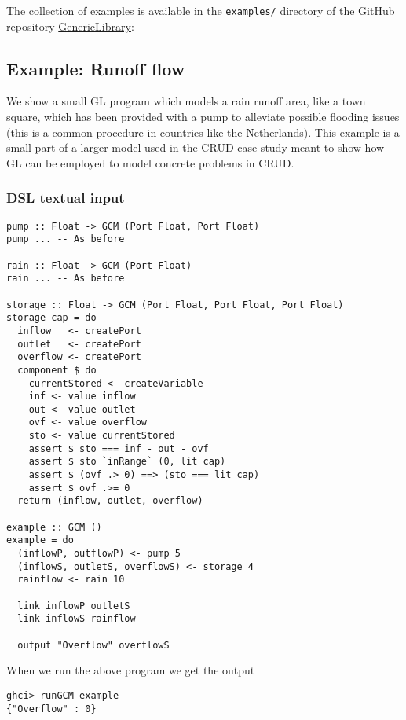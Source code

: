 The collection of examples is available in the \verb+examples/+ directory of the GitHub repository \href{https://github.com/GRACeFUL-project/GenericLibrary}{GenericLibrary}:


\subsection{Example: Runoff flow}
\label{example-runoff-flow}

We show a small GL program which models a rain runoff area, like a
town square, which has been provided with a pump to alleviate possible
flooding issues (this is a common procedure in countries like the
Netherlands).
%
This example is a small part of a larger model used in the CRUD case
study meant to show how GL can be employed to model concrete problems
in CRUD.


\subsubsection{DSL textual input}
\label{example-runoff-flow-dsl-textual-input}


\begin{verbatim}
pump :: Float -> GCM (Port Float, Port Float)
pump ... -- As before

rain :: Float -> GCM (Port Float)
rain ... -- As before

storage :: Float -> GCM (Port Float, Port Float, Port Float)
storage cap = do
  inflow   <- createPort
  outlet   <- createPort
  overflow <- createPort
  component $ do
    currentStored <- createVariable
    inf <- value inflow
    out <- value outlet
    ovf <- value overflow
    sto <- value currentStored
    assert $ sto === inf - out - ovf
    assert $ sto `inRange` (0, lit cap)
    assert $ (ovf .> 0) ==> (sto === lit cap)
    assert $ ovf .>= 0
  return (inflow, outlet, overflow)

example :: GCM ()
example = do
  (inflowP, outflowP) <- pump 5
  (inflowS, outletS, overflowS) <- storage 4
  rainflow <- rain 10

  link inflowP outletS
  link inflowS rainflow

  output "Overflow" overflowS
\end{verbatim}

When we run the above program we get the output

\begin{verbatim}
ghci> runGCM example
{"Overflow" : 0}
\end{verbatim}

